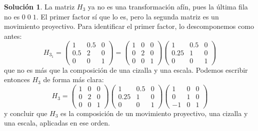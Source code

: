 \documentclass[a4paper, 11pt]{article}
\theoremstyle{definition}
\newtheorem*{solucion}{Solución}
\theoremstyle{theorem}
\begin{document}
\begin{solucion}
      La matriz $H_3$ ya no es una transformación afín, pues la última fila no es $0\;0\;1$. El primer factor sí que lo es, pero la segunda matriz es un movimiento proyectivo. Para identificar el primer factor, lo descomponemos como antes:
      \[
          H_{3_1} = \left(
          \begin{array}{ccc}
              1 & 0.5 & 0 \\
              0.5 & 2 & 0 \\
              0 & 0 & 1
          \end{array}
          \right) =
          \left(
          \begin{array}{ccc}
              1 & 0 & 0 \\
              0 & 2 & 0 \\
              0 & 0 & 1
          \end{array}
          \right)
          \left(
          \begin{array}{ccc}
              1 & 0.5 & 0 \\
              0.25 & 1 & 0 \\
              0 & 0 & 1
          \end{array}
          \right)
      \]
      que no es más que la composición de una cizalla y una escala. Podemos escribir entonces $H_3$ de forma más clara:
      \[
          H_3 =
          \left(
          \begin{array}{ccc}
              1 & 0 & 0 \\
              0 & 2 & 0 \\
              0 & 0 & 1
          \end{array}
          \right)
          \left(
          \begin{array}{ccc}
              1 & 0.5 & 0 \\
              0.25 & 1 & 0 \\
              0 & 0 & 1
          \end{array}
          \right)
          \left(
          \begin{array}{ccc}
              1 & 0 & 0 \\
              0 & 1 & 0 \\
              -1 & 0 & 1
          \end{array}
          \right)
      \]
      y concluir que  $H_3$ es la composición de un movimiento proyectivo, una cizalla y una escala, aplicadas en ese orden.


  \end{solucion}
\end{document}
